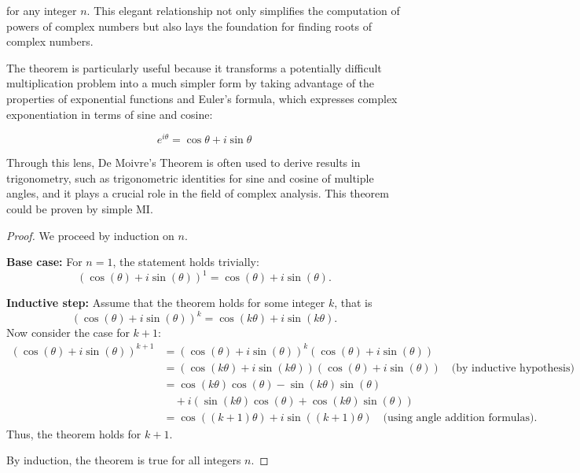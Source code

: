 for any integer \( n \). This elegant relationship not only simplifies the computation of powers of complex numbers but also lays the foundation for finding roots of complex numbers.

The theorem is particularly useful because it transforms a potentially difficult multiplication problem into a much simpler form by taking advantage of the properties of exponential functions and Euler's formula, which expresses complex exponentiation in terms of sine and cosine:

\begin{equation}
    e^{i\theta} = \cos \theta + i\sin \theta
\end{equation}

Through this lens, De Moivre's Theorem is often used to derive results in trigonometry, such as trigonometric identities for sine and cosine of multiple angles, and it plays a crucial role in the field of complex analysis.
This theorem could be proven by simple MI.
\begin{proof}
    We proceed by induction on \( n \).
    
    \textbf{Base case:} For \( n = 1 \), the statement holds trivially:
    \[
    (\cos(\theta) + i \sin(\theta))^1 = \cos(\theta) + i \sin(\theta).
    \]
    
    \textbf{Inductive step:} Assume that the theorem holds for some integer \( k \), that is
    \[
    (\cos(\theta) + i \sin(\theta))^k = \cos(k\theta) + i \sin(k\theta).
    \]
    Now consider the case for \( k + 1 \):
    \begin{align*}
    (\cos(\theta) + i \sin(\theta))^{k+1} &= (\cos(\theta) + i \sin(\theta))^k (\cos(\theta) + i \sin(\theta)) \\
    &= (\cos(k\theta) + i \sin(k\theta))(\cos(\theta) + i \sin(\theta)) \quad \text{(by inductive hypothesis)}\\
    &= \cos(k\theta)\cos(\theta) - \sin(k\theta)\sin(\theta) \\
    &\quad + i(\sin(k\theta)\cos(\theta) + \cos(k\theta)\sin(\theta)) \\
    &= \cos((k+1)\theta) + i \sin((k+1)\theta) \quad \text{(using angle addition formulas)}.
    \end{align*}
    Thus, the theorem holds for \( k + 1 \).
    
    By induction, the theorem is true for all integers \( n \).
    \end{proof}

